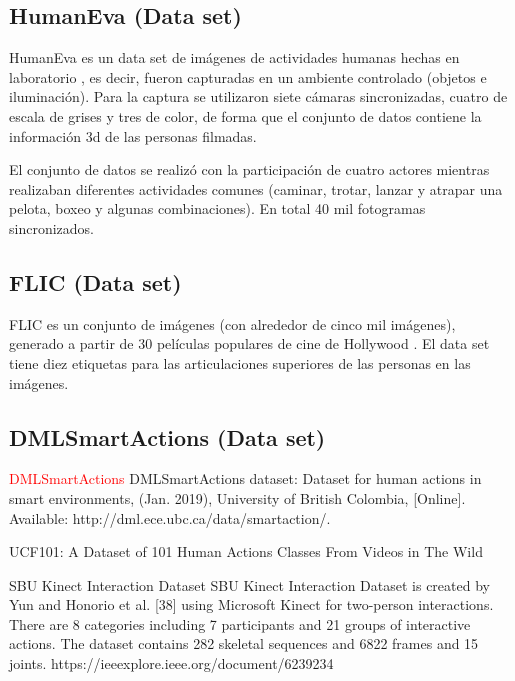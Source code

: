     \subsection{HumanEva (Data set)}
    \label{sub:FrameHumanEva}
    
        HumanEva es un data set de imágenes de actividades humanas hechas en laboratorio \cite{Sigal2010Humaneva, Humaneva2020Home}, es decir, fueron capturadas en un ambiente controlado (objetos e iluminación). Para la captura se utilizaron siete cámaras sincronizadas, cuatro de escala de grises y tres de color, de forma que el conjunto de datos contiene la información 3d de las personas filmadas.
        
        El conjunto de datos se realizó con la participación de cuatro actores mientras realizaban diferentes actividades comunes (caminar, trotar, lanzar y atrapar una pelota, boxeo y algunas combinaciones). En total 40 mil fotogramas sincronizados.
        
    \subsection{FLIC (Data set)}
    \label{sub:FrameFLIC}
        
        FLIC es un conjunto de imágenes (con alrededor de cinco mil imágenes), generado a partir de 30 películas populares de cine de Hollywood \cite{FLIC2013}. El data set tiene diez etiquetas para las articulaciones superiores de las personas en las imágenes.
    
    \subsection{DMLSmartActions (Data set)}
    \label{sub:FrameDMLSmartActions}
    \textcolor{red}{DMLSmartActions}
    DMLSmartActions dataset: Dataset for human actions in smart
environments, (Jan. 2019), University of British Colombia, [Online].
Available: http://dml.ece.ubc.ca/data/smartaction/.
        
        
        UCF101: A Dataset of 101 Human Actions Classes From Videos in The Wild
        
        
        SBU Kinect Interaction Dataset SBU Kinect Interaction
Dataset is created by Yun and Honorio et al. [38] using Microsoft
Kinect for two-person interactions. There are 8 categories including 7 participants and 21 groups of interactive actions. The dataset contains 282 skeletal sequences and 6822 frames and 15 joints. https://ieeexplore.ieee.org/document/6239234
        
